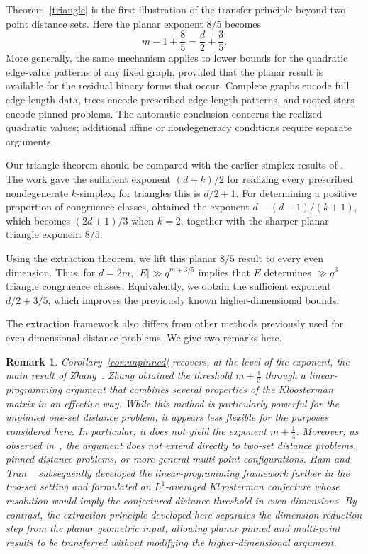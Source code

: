 \documentclass[11pt]{article}
\newtheorem{remark}[theorem]{Remark}
\begin{document}
Theorem~\ref{triangle} is the first illustration of the transfer principle beyond two-point distance sets.  Here the planar exponent \(8/5\) becomes
\[
    m-1+\frac85
    =
    \frac d2+\frac35.
\]
More generally, the same mechanism applies to lower bounds for the quadratic edge-value patterns of any fixed graph, provided that the planar result is available for the residual binary forms that occur.  Complete graphs encode full edge-length data, trees encode prescribed edge-length patterns, and rooted stars encode pinned problems.  The automatic conclusion concerns the realized quadratic values; additional affine or nondegeneracy conditions require separate arguments.

Our triangle theorem should be compared with the earlier simplex results of \cite{BHIPR, CEHIK}.  The work \cite{CEHIK} gave the sufficient exponent $(d+k)/2$ for realizing every prescribed nondegenerate \(k\)-simplex; for triangles this is \(d/2+1\).  For determining a positive proportion of congruence classes, \cite{BHIPR} obtained the exponent $d-(d-1)/(k+1)$, which becomes \((2d+1)/3\) when \(k=2\), together with the sharper planar triangle exponent \(8/5\).

Using the extraction theorem, we lift this planar \(8/5\) result to every even dimension. Thus, for \(d=2m\), $|E|\gg q^{m+3/5}$ implies that \(E\) determines \(\gg q^3\) triangle congruence classes. Equivalently, we obtain the sufficient exponent $d/2+3/5$, which improves the previously known higher-dimensional bounds.

The extraction framework also differs from other methods previously used for even-dimensional distance problems.  We give two remarks here.







\begin{remark}
Corollary~\ref{cor:unpinned} recovers, at the level of the
exponent, the main result of Zhang~\cite{ZhangLP}. Zhang obtained the
threshold \(m+\frac{1}{3}\) through a linear-programming argument that
combines several properties of the Kloosterman matrix in an effective
way. While this method is particularly powerful for the unpinned
one-set distance problem, it appears less flexible for the purposes
considered here. In particular, it does not yield the exponent
\(m+\frac{1}{4}\). Moreover, as observed in~\cite{HT}, the argument
does not extend directly to two-set distance problems, pinned distance
problems, or more general multi-point configurations. Ham and Tran ~\cite{HT} subsequently developed the linear-programming framework
further in the two-set setting and formulated an \(L^1\)-averaged
Kloosterman conjecture whose resolution would imply the conjectured
distance threshold in even dimensions. By contrast, the extraction
principle developed here separates the dimension-reduction step from
the planar geometric input, allowing planar pinned and multi-point
results to be transferred without modifying the higher-dimensional
argument.
\end{remark}
\end{document}
